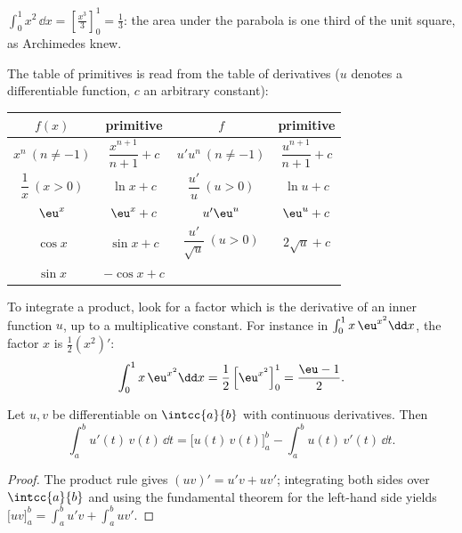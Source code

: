 \begin{example}
$\displaystyle\int_0^1 x^2\,\dd x = \left[\frac{x^3}{3}\right]_0^1 =
\frac13$: the area under the parabola is one third of the unit square, as
Archimedes knew.
\end{example}

The table of primitives is read from the table of derivatives
($u$ denotes a differentiable function, $c$ an arbitrary constant):
\begin{center}
\renewcommand{\arraystretch}{1.7}
\begin{tabular}{c|c||c|c}
$f(x)$ & primitive & $f$ & primitive \\
\hline
$x^n \ (n \neq -1)$ & $\dfrac{x^{n+1}}{n+1} + c$ &
$u'u^n \ (n \neq -1)$ & $\dfrac{u^{n+1}}{n+1} + c$\\
$\dfrac1x \ (x > 0)$ & $\ln x + c$ &
$\dfrac{u'}{u} \ (u > 0)$ & $\ln u + c$\\
$\eu^x$ & $\eu^x + c$ &
$u'\eu^u$ & $\eu^u + c$\\
$\cos x$ & $\sin x + c$ &
$\dfrac{u'}{\sqrt u} \ (u>0)$ & $2\sqrt u + c$\\
$\sin x$ & $-\cos x + c$ & &
\end{tabular}
\end{center}

\begin{method}\label{met:tle:integ:uprime}
To integrate a product, look for a factor which is the derivative of an inner
function $u$, up to a multiplicative constant. For instance in
$\int_0^1 x\,\eu^{x^2}\dd x$, the factor $x$ is $\frac12 (x^2)'$:
\[
\int_0^1 x\,\eu^{x^2}\dd x = \frac12\left[\eu^{x^2}\right]_0^1
= \frac{\eu - 1}{2}.
\]
\end{method}

\begin{theorem}\label{thm:tle:integ:ibp}
Let $u, v$ be differentiable on $\intcc{a}{b}$ with continuous derivatives.
Then
\[
\int_a^b u'(t)\,v(t)\,\dd t
= \bigl[u(t)\,v(t)\bigr]_a^b - \int_a^b u(t)\,v'(t)\,\dd t .
\]
\end{theorem}

\begin{proof}
The product rule gives $(uv)' = u'v + uv'$; integrating both sides over
$\intcc{a}{b}$ and using the fundamental theorem for the left-hand side
yields $\bigl[uv\bigr]_a^b = \int_a^b u'v + \int_a^b uv'$.
\end{proof}

